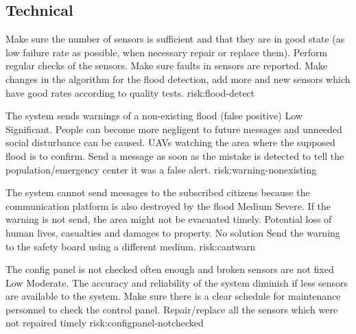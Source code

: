

\subsection{Technical}

{Make sure the number of sensors is sufficient and that they are in good state (as low failure rate as possible, when necessary repair or replace them). Perform regular checks of the sensors. Make sure faults in sensors are reported. }
{Make changes in the algorithm for the flood detection, add more and new sensors which have good rates according to quality tests.}
{risk:flood-detect}

{The system sends warnings of a non-existing flood (false positive)} %
{Low}
{Significant. People can become more negligent to future messages and unneeded social disturbance can be caused.}
{UAVs watching the area where the supposed flood is to confirm.}
{Send a message as soon as the mistake is detected to tell the population/emergency center it was a false alert. }
{risk:warning-nonexisting}

{The system cannot send messages to the subscribed citizens because the communication platform is also destroyed by the flood}
{Medium}
{Severe. If the warning is not send, the area might not be evacuated timely. Potential loss of human lives, casualties and damages to property. }
{No solution}
{Send the warning to the safety board using a different medium.}
{risk:cantwarn}
	
{The config panel is not checked often enough and broken sensors are not fixed}
{Low}
{Moderate. The accuracy and reliability of the system diminish if less sensors are available to the system.}
{Make sure there is a clear schedule for maintenance personnel to check the control panel.}
{Repair/replace all the sensors which were not repaired timely}
{risk:configpanel-notchecked}
	
